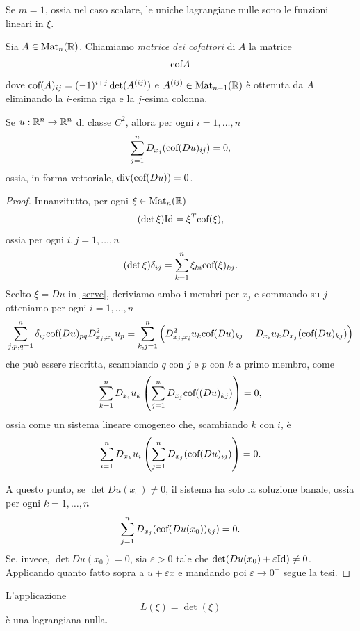 Se $m=1$, ossia nel caso scalare, le uniche lagrangiane nulle sono le funzioni lineari in $\xi$. 

\begin{definizione}
	Sia $A \in \textup{Mat}_{n}(\R)$. Chiamiamo \emph{matrice dei cofattori} di $A$ la matrice 
	\[ \textup{cof}A \]
	dove $\textup{cof}(A)_{ij} = (-1)^{i+j}\det(A^{(ij)})$ e $A^{(ij)} \in \textup{Mat}_{n-1}(\R)$ è ottenuta da $A$ eliminando la $i$-esima riga e la $j$-esima colonna.
\end{definizione}
\begin{lemma}
	Se $u:\R^n \to \R^n$ di classe $C^2$, allora per ogni $i=1,\dots, n$
	\[ \sum_{j=1}^{n} D_{x_j}(\textup{cof}(Du)_{ij}) = 0,\]
	ossia, in forma vettoriale, $\div (\textup{cof}(Du)) = 0$.
\end{lemma}
\begin{proof}
	Innanzitutto, per ogni $\xi \in \textup{Mat}_{n}(\R)$
	\[ (\det \xi)\textup{Id} = \xi^T\textup{cof}(\xi), \]
	ossia per ogni $i,j=1,\dots,n$
	\begin{equation}\label{serve}
		(\det \xi)\delta_{ij} = \sum_{k=1}^{n} \xi_{ki}\textup{cof}(\xi)_{kj}.
	\end{equation}
	Scelto $\xi = Du$ in \eqref{serve}, deriviamo ambo i membri per $x_j$ e sommando su $j$ otteniamo per ogni $i=1,\dots, n$
	\[ \sum_{j,p,q=1}^{n} \delta_{ij}\textup{cof}(Du)_{pq}D^2_{x_j,x_q}u_p = \sum_{k,j=1}^{n}\left(  D^2_{x_j,x_i}u_k \textup{cof}(Du)_{kj} + D_{x_i}u_k D_{x_j}(\textup{cof}(Du)_{kj}) \right) \]
	che può essere riscritta, scambiando $q$ con $j$ e $p$ con $k$ a primo membro, come 
	\[ \sum_{k=1}^n D_{x_i}u_k \left( \sum_{j=1}^{n}D_{x_j}\textup{cof}((Du)_{kj})\right) =0, \]
	ossia come un sistema lineare omogeneo che, scambiando $k$ con $i$, è 
	\[ \sum_{i=1}^n D_{x_k}u_i \left( \sum_{j=1}^{n}D_{x_j}(\textup{cof}(Du)_{ij})\right) =0. \]
	
	A questo punto, se $\det Du(x_0) \ne 0$, il sistema ha solo la soluzione banale, ossia per ogni  $k=1,\dots,n$
	\[ \sum_{j=1}^{n}D_{x_j}(\textup{cof}(Du(x_0))_{kj})=0. \]
	Se, invece, $\det Du(x_0) = 0$, sia $\varepsilon >0$ tale che $\det(Du(x_0) + \varepsilon\textup{Id}) \ne 0$. Applicando quanto fatto sopra a $u + \varepsilon x$ e mandando poi $\varepsilon \to 0^+$ segue la tesi.
\end{proof}
\begin{teorema}
	L'applicazione 
	\[ L(\xi) = \det(\xi) \]
	è una lagrangiana nulla.
\end{teorema}
